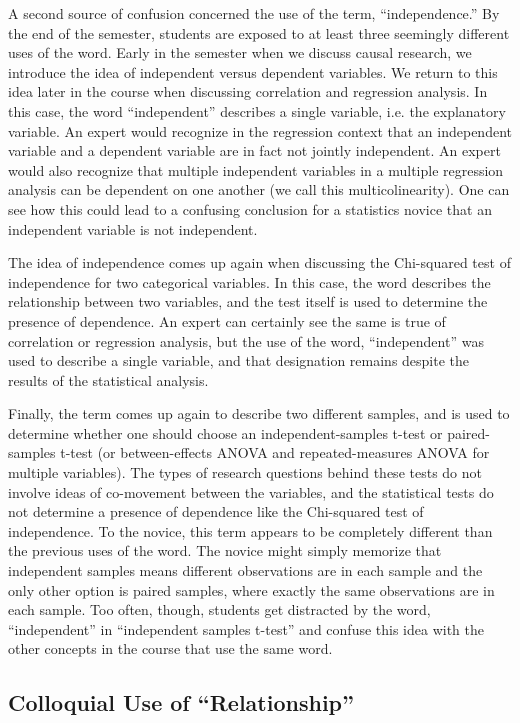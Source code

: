 \documentclass[12pt]{article}
\begin{document}
A second source of confusion concerned the use of the term, ``independence.''  By the end of the semester, students are exposed to at least three seemingly different uses of the word.  Early in the semester when we discuss causal research, we introduce the idea of independent versus dependent variables. We return to this idea later in the course when discussing correlation and regression analysis.  In this case, the word ``independent'' describes a single variable, i.e. the explanatory variable.  An expert would recognize in the regression context that an independent variable and a dependent variable are in fact not jointly independent.  An expert would also recognize that multiple independent variables in a multiple regression analysis can be dependent on one another (we call this multicolinearity).  One can see how this could lead to a confusing conclusion for a statistics novice that an independent variable is not independent.  

The idea of independence comes up again when discussing the Chi-squared test of independence for two categorical variables.  In this case, the word describes the relationship between two variables, and the test itself is used to determine the presence of dependence.  An expert can certainly see the same is true of correlation or regression analysis, but the use of the word, ``independent'' was used to describe a single variable, and that designation remains despite the results of the statistical analysis.

Finally, the term comes up again to describe two different samples, and is used to determine whether one should choose an independent-samples t-test or paired-samples t-test (or between-effects ANOVA and repeated-measures ANOVA for multiple variables).  The types of research questions behind these tests do not involve ideas of co-movement between the variables, and the statistical tests do not determine a presence of dependence like the Chi-squared test of independence.  To the novice, this term appears to be completely different than the previous uses of the word.  The novice might simply memorize that independent samples means different observations are in each sample and the only other option is paired samples, where exactly the same observations are in each sample.  Too often, though, students get distracted by the word, ``independent'' in ``independent samples t-test'' and confuse this idea with the other concepts in the course that use the same word.


\subsection{Colloquial Use of ``Relationship''}
\end{document}
